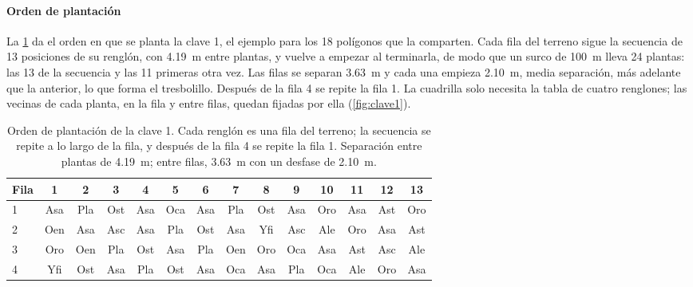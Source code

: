 \paragraph{Orden de plantación} La \cref{tab:orden} da el orden en que se planta la clave 1, el ejemplo para los 18 polígonos que la comparten. Cada fila del terreno sigue la secuencia de 13 posiciones de su renglón, con 4.19~m entre plantas, y vuelve a empezar al terminarla, de modo que un surco de 100~m lleva 24 plantas: las 13 de la secuencia y las 11 primeras otra vez. Las filas se separan 3.63~m y cada una empieza 2.10~m, media separación, más adelante que la anterior, lo que forma el tresbolillo. Después de la fila 4 se repite la fila 1. La cuadrilla solo necesita la tabla de cuatro renglones; las vecinas de cada planta, en la fila y entre filas, quedan fijadas por ella (\cref{fig:clave1}).

\begin{table}[t]
\centering
\caption{Orden de plantación de la clave 1. Cada renglón es una fila del terreno; la secuencia se repite a lo largo de la fila, y después de la fila 4 se repite la fila 1. Separación entre plantas de 4.19~m; entre filas, 3.63~m con un desfase de 2.10~m.}
\label{tab:orden}
\small
\setlength{\tabcolsep}{4pt}
\begin{tabular}{@{}lccccccccccccc@{}}
\toprule
Fila & 1 & 2 & 3 & 4 & 5 & 6 & 7 & 8 & 9 & 10 & 11 & 12 & 13 \\
\midrule
1 & Asa & Pla & Ost & Asa & Oca & Asa & Pla & Ost & Asa & Oro & Asa & Ast & Oro \\
2 & Oen & Asa & Asc & Asa & Pla & Ost & Asa & Yfi & Asc & Ale & Oro & Asa & Ast \\
3 & Oro & Oen & Pla & Ost & Asa & Pla & Oen & Oro & Oca & Asa & Ast & Asc & Ale \\
4 & Yfi & Ost & Asa & Pla & Ost & Asa & Oca & Asa & Pla & Oca & Ale & Oro & Asa \\
\bottomrule
\end{tabular}
\end{table}
